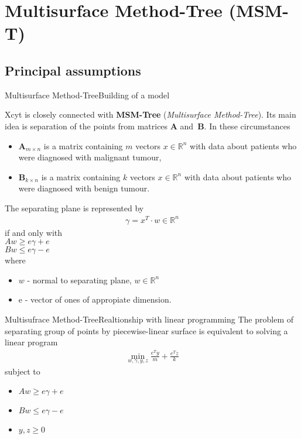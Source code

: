 \documentclass{beamer}
\begin{document}
\section{Multisurface Method-Tree (MSM-T)}
\subsection{Principal assumptions}
\begin{frame}[allowframebreaks]{Multisurface Method-Tree}{Building of a model}

Xcyt is closely connected with \textbf{MSM-Tree} (\textit{Multisurface Method-Tree}). Its main idea is separation of the points from matrices \textbf{A} and~\textbf{B}. In these circumstances

\begin{itemize}
\item \textbf{A$_{m \times n}$} is a matrix containing $m$ vectors $x \in \mathbb{R}^n$ with data about patients who were diagnosed with malignant tumour,
\item \textbf{B$_{k \times n}$} is a matrix containing $k$ vectors $x \in \mathbb{R}^n$ with data about patients who were diagnosed with benign tumour.
\end{itemize}



The separating plane is represented by \cite{bcd}
\begin{align*}
\gamma=x^T \cdot w \in \mathbb{R}^n
\end{align*}
if and only with \\
$A w \geq e \gamma + e$ \\
$B w \leq e \gamma - e$\\
where 
\begin{itemize}
\item $w$ - normal to separating plane, $w \in \mathbb{R}^n$
\item e - vector of ones of appropiate dimension.
\end{itemize}



\end{frame}



\begin{frame}{Multisufrace Method-Tree}{Realtionship with linear programming}
The problem of separating group of points by piecewise-linear surface is equivalent to solving a linear program
\begin{align*}
\displaystyle \min_{w,\gamma,y,z}\frac{e^Ty}{m}+\frac{e^Tz}{k}
\end{align*}
subject to
\begin{itemize}
\item $A w \geq e \gamma + e$ 
\item $B w \leq e \gamma - e$
\item $y,z \geq 0$
\end{itemize}
\end{frame}
\end{document}
